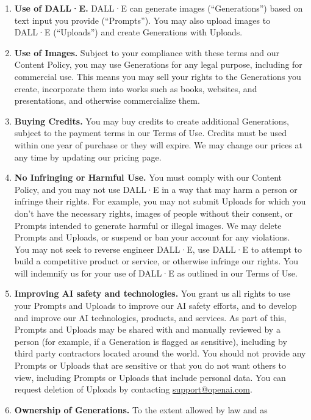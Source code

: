 \begin{enumerate}
\item \textbf{Use of DALL·E.} DALL·E can generate images (``Generations'') based
    on text input you provide (``Prompts''). You may also upload images to
    DALL·E (``Uploads'') and create Generations with Uploads.
\item \textbf{Use of Images.} Subject to your compliance with these terms and
    our Content Policy, you may use Generations for any legal purpose, including
    for commercial use. This means you may sell your rights to the Generations
    you create, incorporate them into works such as books, websites, and
    presentations, and otherwise commercialize them.
\item \textbf{Buying Credits.} You may buy credits to create additional
    Generations, subject to the payment terms in our Terms of Use. Credits must
    be used within one year of purchase or they will expire. We may change our
    prices at any time by updating our pricing page.
\item \textbf{No Infringing or Harmful Use.} You must comply with our Content
    Policy, and you may not use DALL·E in a way that may harm a person or
    infringe their rights. For example, you may not submit Uploads for which you
    don't have the necessary rights, images of people without their consent, or
    Prompts intended to generate harmful or illegal images. We may delete
    Prompts and Uploads, or suspend or ban your account for any violations. You
    may not seek to reverse engineer DALL·E, use DALL·E to attempt to build a
    competitive product or service, or otherwise infringe our rights. You will
    indemnify us for your use of DALL·E as outlined in our Terms of Use.
\item \textbf{Improving AI safety and technologies.} You grant us all rights to
    use your Prompts and Uploads to improve our AI safety efforts, and to
    develop and improve our AI technologies, products, and services. As part of
    this, Prompts and Uploads may be shared with and manually reviewed by a
    person (for example, if a Generation is flagged as sensitive), including by
    third party contractors located around the world. You should not provide any
    Prompts or Uploads that are sensitive or that you do not want others to
    view, including Prompts or Uploads that include personal data. You can
    request deletion of Uploads by contacting \url{support@openai.com}.
\item \textbf{Ownership of Generations.} To the extent allowed by law and as

\end{enumerate}
